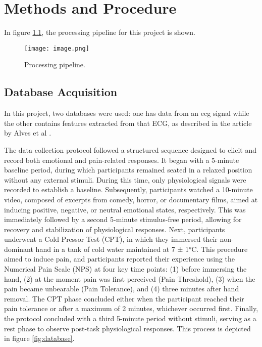 \chapter{Methods and Procedure}
\label{chapter:methods}

In figure \ref{fig:image}, the processing pipeline for this project is shown.

\begin{figure}[h!]
    \centering
    \texttt{[image: image.png]}
    \caption{Processing pipeline.}
    \label{fig:image}
\end{figure}

\section{Database Acquisition}
In this project, two databases were used: one has data from an \ac{ecg} signal while the other contains features extracted from that ECG, as described in the article by Alves et al \cite{Alves2024}.

The data collection protocol followed a structured sequence designed to elicit and record both emotional and pain-related responses. It began with a 5-minute baseline period, during which participants remained seated in a relaxed position without any external stimuli. During this time, only physiological signals were recorded to establish a baseline.
Subsequently, participants watched a 10-minute video, composed of excerpts from comedy, horror, or documentary films, aimed at inducing positive, negative, or neutral emotional states, respectively. This was immediately followed by a second 5-minute stimulus-free period, allowing for recovery and stabilization of physiological responses.
Next, participants underwent a Cold Pressor Test (CPT), in which they immersed their non-dominant hand in a tank of cold water maintained at 7 ± 1°C. This procedure aimed to induce pain, and participants reported their experience using the Numerical Pain Scale (NPS) at four key time points: (1) before immersing the hand, (2) at the moment pain was first perceived (Pain Threshold), (3) when the pain became unbearable (Pain Tolerance), and (4) three minutes after hand removal. The CPT phase concluded either when the participant reached their pain tolerance or after a maximum of 2 minutes, whichever occurred first.
Finally, the protocol concluded with a third 5-minute period without stimuli, serving as a rest phase to observe post-task physiological responses. 
This process is depicted in figure \ref{fig:database}. 


